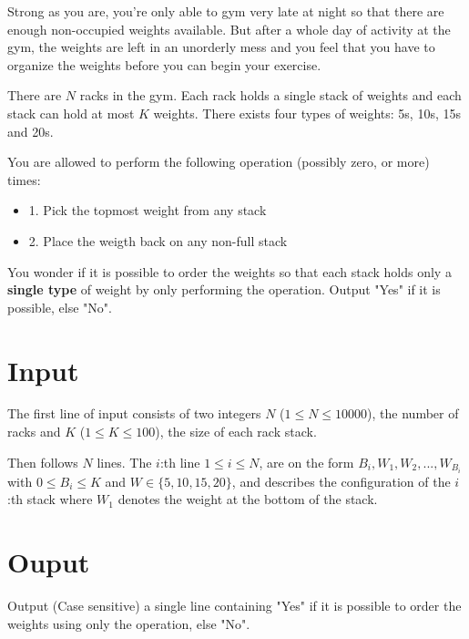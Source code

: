 
Strong as you are, you're only able to gym very late at night so that there are enough non-occupied weights available. 
But after a whole day of activity at the gym, the weights are left in an unorderly mess and you feel that you have to organize the weights before you can begin your exercise.

There are $N$ racks in the gym. Each rack holds a single stack of weights and each stack can hold at most $K$ weights. 
There exists four types of weights: 5s, 10s, 15s and 20s.

You are allowed to perform the following operation (possibly zero, or more) times:

\begin{itemize}
    \item{1. Pick the topmost weight from any stack}
    \item{2. Place the weigth back on any non-full stack}
\end{itemize}


You wonder if it is possible to order the weights so that each stack holds only a \textbf{single type} of weight by only performing the operation. Output "Yes" if it is possible, else "No".

\section*{Input}
The first line of input consists of two integers $N$ ($1 \leq N \leq 10000$), the number of racks and $K$ ($1 \leq K \leq 100$), the size of each rack stack.

Then follows $N$ lines. The $i$:th line $1 \leq i \leq N$, are on the form $B_i, W_1, W_2, ..., W_{B_i}$ with $0 \leq B_i \leq K$ and $W \in \{5,10,15,20\}$, and describes the configuration of the $i$:th stack where $W_1$ denotes the weight at the bottom of the stack.
\section*{Ouput}
Output (Case sensitive) a single line containing "Yes" if it is possible to order the weights using only the operation, else "No".